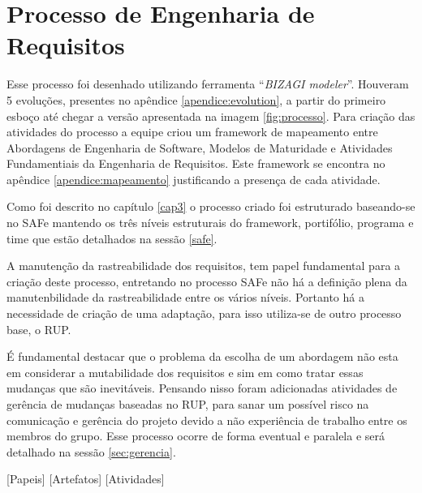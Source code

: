 \chapter[Processo de Engenharia de Requisitos]{Processo de Engenharia de Requisitos}\label{cap4}

Esse processo foi desenhado utilizando ferramenta ``\textit{BIZAGI modeler}''. Houveram 5 evoluções,
presentes no apêndice \ref{apendice:evolution}, a partir do primeiro esboço até chegar a versão apresentada na imagem \ref{fig:processo}. Para criação das atividades do processo
a equipe criou um framework de mapeamento entre Abordagens de Engenharia de Software, Modelos de Maturidade e Atividades Fundamentiais da Engenharia de Requisitos. Este framework se encontra
no apêndice \ref{apendice:mapeamento} justificando a presença de cada atividade.

Como foi descrito no capítulo \ref{cap3} o processo criado foi estruturado baseando-se no
SAFe mantendo os três níveis estruturais do framework, portifólio, programa e time
que estão detalhados na sessão \ref{safe}.

A manutenção da rastreabilidade dos requisitos, tem papel fundamental para a criação deste processo,
entretando no processo SAFe não há a definição plena da manutenbilidade da rastreabilidade entre os
vários níveis. Portanto há a necessidade de criação de uma adaptação, para isso utiliza-se de
outro processo base, o RUP.

É fundamental destacar que o problema da escolha de um abordagem não esta em considerar
a mutabilidade dos requisitos e sim em como tratar essas mudanças que são inevitáveis.
Pensando nisso foram adicionadas atividades de gerência de mudanças baseadas no RUP,
para sanar um possível risco na comunicação e gerência do projeto devido a não experiência
de trabalho entre os membros do grupo. Esse processo ocorre de forma eventual e paralela
e será detalhado na sessão \ref{sec:gerencia}.

[Papeis]
[Artefatos]
[Atividades]

